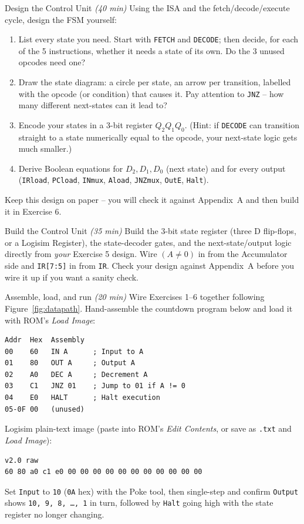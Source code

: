 \documentclass[11pt]{article}
\begin{document}
\begin{labexercise}{Design the Control Unit \hfill {\small \itshape (40 min)}}
Using the ISA and the fetch/decode/execute cycle, design the FSM yourself:
\begin{enumerate}[nosep,leftmargin=*]
  \item List every state you need. Start with \texttt{FETCH} and \texttt{DECODE};
        then decide, for each of the 5 instructions, whether it needs a state of
        its own. Do the 3 unused opcodes need one?
  \item Draw the state diagram: a circle per state, an arrow per transition,
        labelled with the opcode (or condition) that causes it. Pay attention to
        \texttt{JNZ} -- how many different next-states can it lead to?
  \item Encode your states in a 3-bit register $Q_2Q_1Q_0$. (Hint: if
        \texttt{DECODE} can transition straight to a state numerically equal to
        the opcode, your next-state logic gets much smaller.)
  \item Derive Boolean equations for $D_2, D_1, D_0$ (next state) and for every
        output (\texttt{IRload}, \texttt{PCload}, \texttt{INmux}, \texttt{Aload},
        \texttt{JNZmux}, \texttt{OutE}, \texttt{Halt}).
\end{enumerate}
Keep this design on paper -- you will check it against Appendix~A and then build it
in Exercise 6.
\end{labexercise}

\begin{labexercise}{Build the Control Unit \hfill {\small \itshape (35 min)}}
Build the 3-bit state register (three D flip-flops, or a Logisim Register), the
state-decoder gates, and the next-state/output logic directly from \emph{your}
Exercise 5 design. Wire $(A\neq0)$ in from the Accumulator side and
\texttt{IR[7:5]} in from \texttt{IR}. Check your design against Appendix~A before
you wire it up if you want a sanity check.
\end{labexercise}

\begin{labexercise}{Assemble, load, and run \hfill {\small \itshape (20 min)}}
Wire Exercises 1--6 together following Figure~\ref{fig:datapath}. Hand-assemble the
countdown program below and load it with ROM's \emph{Load Image}:
\begin{lstlisting}
Addr  Hex  Assembly
00    60   IN A      ; Input to A
01    80   OUT A     ; Output A
02    A0   DEC A     ; Decrement A
03    C1   JNZ 01    ; Jump to 01 if A != 0
04    E0   HALT      ; Halt execution
05-0F 00   (unused)
\end{lstlisting}
Logisim plain-text image (paste into ROM's \emph{Edit Contents}, or save as
\texttt{.txt} and \emph{Load Image}):
\begin{lstlisting}
v2.0 raw
60 80 a0 c1 e0 00 00 00 00 00 00 00 00 00 00 00
\end{lstlisting}
Set \texttt{Input} to \texttt{10} (\texttt{0A} hex) with the Poke tool, then
single-step and confirm \texttt{Output} shows \texttt{10, 9, 8, \ldots, 1} in
turn, followed by \texttt{Halt} going high with the state register no longer
changing.
\end{labexercise}
\end{document}
